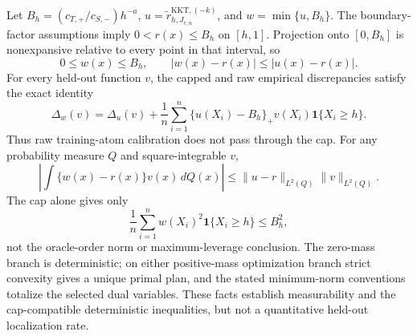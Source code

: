 Let \(B_h=(c_{T,+}/c_{S,-})h^{-a}\), \(u=\widetilde r^{\mathrm{KKT},(-k)}_{h,J_{r,n}}\), and \(w=\min\{u,B_h\}\). The boundary-factor assumptions imply \(0<r(x)\le B_h\) on \([h,1]\). Projection onto \([0,B_h]\) is nonexpansive relative to every point in that interval, so
\[
0\le w(x)\le B_h,
\qquad
|w(x)-r(x)|\le |u(x)-r(x)|.
\]
For every held-out function \(v\), the capped and raw empirical discrepancies satisfy the exact identity
\[
\Delta_w(v)=\Delta_u(v)+\frac1n\sum_{i=1}^n\{u(X_i)-B_h\}_+v(X_i)\mathbf 1\{X_i\ge h\}.
\]
Thus raw training-atom calibration does not pass through the cap. For any probability measure \(Q\) and square-integrable \(v\),
\[
\left|\int\{w(x)-r(x)\}v(x)\,dQ(x)\right|
\le \|u-r\|_{L^2(Q)}\|v\|_{L^2(Q)}.
\]
The cap alone gives only
\[
\frac1n\sum_{i=1}^nw(X_i)^2\mathbf 1\{X_i\ge h\}\le B_h^2,
\]
not the oracle-order norm or maximum-leverage conclusion. The zero-mass branch is deterministic; on either positive-mass optimization branch strict convexity gives a unique primal plan, and the stated minimum-norm conventions totalize the selected dual variables. These facts establish measurability and the cap-compatible deterministic inequalities, but not a quantitative held-out localization rate.